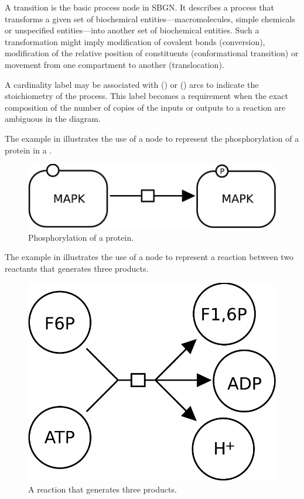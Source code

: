 A transition is the basic process node in SBGN.  It describes a process that transforms a given set of biochemical entities---macromolecules, simple chemicals or unspecified entities---into another set of biochemical entities.  Such a transformation might imply modification of covalent bonds (conversion), modification of the relative position of constituents (conformational transition) or movement from one compartment to another (translocation).

A cardinality label may be associated with  () or  () arcs to indicate the stoichiometry of the process.  This label becomes a requirement when the exact composition of the number of copies of the inputs or outputs to a reaction are ambiguous in the diagram.

The example in  illustrates the use of a  node to represent the phosphorylation of a protein in a \PD.

\begin{figure}[H]
  \centering
  \includegraphics[scale = 0.3]{examples/transition-phosphorylation}
  \caption{Phosphorylation of a protein.}
  \label{fig:trans-phos}
\end{figure}

The example in  illustrates the use of a  node to represent a reaction between two reactants that generates three products. 

\begin{figure}[H]
  \centering
  \includegraphics[scale = 0.3]{examples/transition-reaction}
  \caption{A reaction that generates three products.}
  \label{fig:trans-react}
\end{figure}

